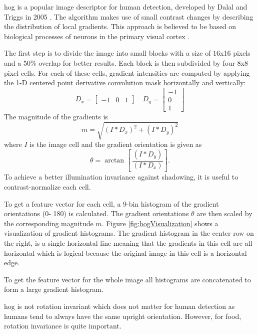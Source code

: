 \acrfull{hog} is a popular image descriptor for human detection, developed by Dalal and Triggs in 2005 \cite{Dalal2005}. The algorithm makes use of small contrast changes by describing the distribution of local gradients. This approach is believed to be based on biological processes of neurons in the primary visual cortex \cite{Lowe2004}.

The first step is to divide the image into small blocks with a size of 16x16 pixels and a 50\% overlap for better results. Each block is then subdivided by four 8x8 pixel cells. For each of these cells, gradient intensities are computed by applying the 1-D centered point derivative convolution mask horizontally and vertically:
\begin{equation}
	D_x=
	\begin{bmatrix}
	-1 & 0 & 1
	\end{bmatrix} 
	\quad
	D_y=
	\begin{bmatrix}
	-1 \\ 0 \\ 1
	\end{bmatrix} 
\end{equation}   
The magnitude of the gradients is
\begin{equation}
	m=\sqrt{(I\ast D_x)^2+(I\ast D_y)^2}
\end{equation}
where $I$ is the image cell and the gradient orientation is given as
\begin{equation}
	\theta = \arctan \left[\ \frac{(I\ast D_y)}{(I\ast D_x)}\right]\text{.}
\end{equation}
To achieve a better illumination invariance against shadowing, it is useful to contrast-normalize each cell. 

To get a feature vector for each cell, a 9-bin histogram of the gradient orientations {(0\degree - 180\degree)} is calculated. The gradient orientations $\theta$ are then scaled by the corresponding magnitude $m$. Figure \ref{fig:hogVisualization} shows a visualization of gradient histograms. The gradient histogram in the center row on the right, is a single horizontal line meaning that the gradients in this cell are all horizontal which is logical because the original image in this cell is a horizontal edge.

To get the feature vector for the whole image all histograms are concatenated to form a large gradient histogram.

\gls{hog} is not rotation invariant which does not matter for human detection as humans tend to always have the same upright orientation. However, for food, rotation invariance is quite important.

